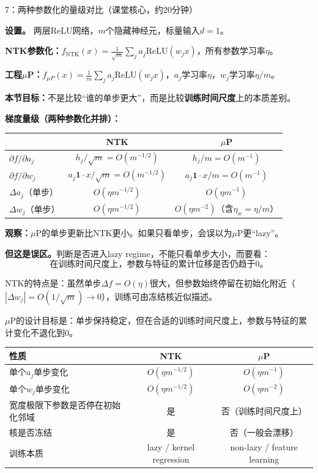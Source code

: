 \documentclass[11pt,a4paper]{article}
\begin{document}
\begin{handcalc}{7：两种参数化的量级对比（课堂核心，约20分钟）}

\textbf{设置。} 两层ReLU网络，$m$个隐藏神经元，标量输入$d=1$。

\textbf{NTK参数化：}$f_{\text{NTK}}(x) = \frac{1}{\sqrt{m}}\sum_j a_j\text{ReLU}(w_j x)$，所有参数学习率$\eta$。

\textbf{工程$\mu$P：}$f_{\mu P}(x) = \frac{1}{m}\sum_j a_j\text{ReLU}(w_j x)$，$a_j$学习率$\eta$，$w_j$学习率$\eta/m$。

\textbf{本节目标：}不是比较``谁的单步更大''，而是比较\textbf{训练时间尺度}上的本质差别。

\tcblower

\textbf{梯度量级（两种参数化并排）：}

\begin{center}
\renewcommand{\arraystretch}{1.35}
\begin{tabular}{l|c|c}
\toprule
& \textbf{NTK} & \textbf{$\mu$P} \\
\midrule
$\partial f/\partial a_j$ & $h_j/\sqrt{m}=O(m^{-1/2})$ & $h_j/m=O(m^{-1})$ \\
$\partial f/\partial w_j$ & $a_j\mathbf{1}\cdot x/\sqrt{m}=O(m^{-1/2})$ & $a_j\mathbf{1}\cdot x/m=O(m^{-1})$ \\
\hline
$\Delta a_j$（单步） & $O(\eta m^{-1/2})$ & $O(\eta m^{-1})$ \\
$\Delta w_j$（单步） & $O(\eta m^{-1/2})$ & $O(\eta m^{-2})$（含$\eta_w=\eta/m$） \\
\bottomrule
\end{tabular}
\end{center}

\textbf{观察：}$\mu$P的单步更新比NTK更小。如果只看单步，会误以为$\mu$P更``lazy''。

\textbf{但这是误区。}判断是否进入lazy regime，不能只看单步大小，而要看：
\[
\boxed{\text{在训练时间尺度上，参数与特征的累计位移是否仍趋于0。}}
\]

NTK的特点是：虽然单步$\Delta f=O(\eta)$很大，但参数始终停留在初始化附近（$|\Delta w_j|=O(1/\sqrt{m})\to 0$），训练可由冻结核近似描述。

$\mu$P的设计目标是：单步保持稳定，但在合适的训练时间尺度上，参数与特征的累计变化不退化到0。

\begin{center}
\renewcommand{\arraystretch}{1.35}
\begin{tabular}{l|c|c}
\toprule
\textbf{性质} & \textbf{NTK} & \textbf{$\mu$P} \\
\midrule
单个$a_j$单步变化 & $O(\eta m^{-1/2})$ & $O(\eta m^{-1})$ \\
单个$w_j$单步变化 & $O(\eta m^{-1/2})$ & $O(\eta m^{-2})$ \\
\hline
宽度极限下参数是否停在初始化邻域 & 是 & 否（训练时间尺度上） \\
核是否冻结 & 是 & 否（一般会漂移） \\
训练本质 & lazy / kernel regression & non-lazy / feature learning \\
\bottomrule
\end{tabular}
\end{center}


\end{handcalc}
\end{document}

